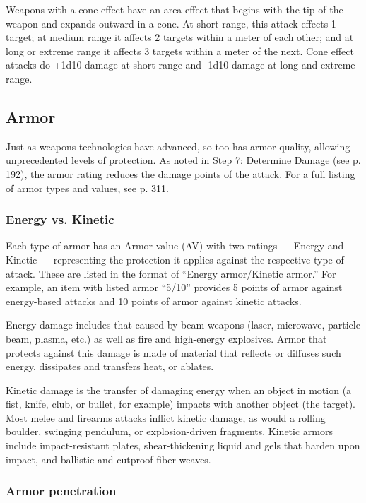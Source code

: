 Weapons with a cone effect have an area effect that begins with the tip of the weapon and expands outward in a cone. At short range, this attack effects 1 target; at medium range it affects 2 targets within a meter of each other; and at long or extreme range it affects 3 targets within a meter of the next. Cone effect attacks do +1d10 damage at short range and -1d10 damage at long and extreme range.


\subsection{Armor}
\label{sec:combat-armor}

Just as weapons technologies have advanced, so too has armor quality, allowing unprecedented levels of protection. As noted in Step 7: Determine Damage (see p. 192), the armor rating reduces the damage points of the attack. For a full listing of armor types and values, see p. 311.

\subsubsection{Energy vs. Kinetic}

Each type of armor has an Armor value (AV) with two ratings --- Energy and Kinetic --- representing the protection it applies against the respective type of attack. These are listed in the format of ``Energy armor/Kinetic armor.'' For example, an item with listed armor ``5/10'' provides 5 points of armor against energy-based attacks and 10 points of armor against kinetic attacks.

Energy damage includes that caused by beam weapons (laser, microwave, particle beam, plasma, etc.) as well as fire and high-energy explosives. Armor that protects against this damage is made of material that reflects or diffuses such energy, dissipates and transfers heat, or ablates.

Kinetic damage is the transfer of damaging energy when an object in motion (a fist, knife, club, or bullet, for example) impacts with another object (the target). Most melee and firearms attacks inflict kinetic damage, as would a rolling boulder, swinging pendulum, or explosion-driven fragments. Kinetic armors include impact-resistant plates, shear-thickening liquid and gels that harden upon impact, and ballistic and cutproof fiber weaves.

\subsubsection{Armor penetration}

